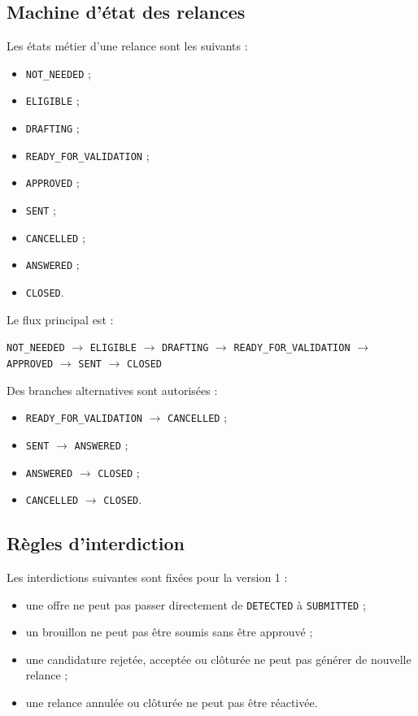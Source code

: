 \documentclass[11pt,a4paper]{article}
\begin{document}
\subsection{Machine d’état des relances}

Les états métier d’une relance sont les suivants :

\begin{itemize}
    \item \texttt{NOT\_NEEDED} ;
    \item \texttt{ELIGIBLE} ;
    \item \texttt{DRAFTING} ;
    \item \texttt{READY\_FOR\_VALIDATION} ;
    \item \texttt{APPROVED} ;
    \item \texttt{SENT} ;
    \item \texttt{CANCELLED} ;
    \item \texttt{ANSWERED} ;
    \item \texttt{CLOSED}.
\end{itemize}

Le flux principal est :

\begin{center}
\texttt{NOT\_NEEDED}
$\rightarrow$
\texttt{ELIGIBLE}
$\rightarrow$
\texttt{DRAFTING}
$\rightarrow$
\texttt{READY\_FOR\_VALIDATION}
$\rightarrow$
\texttt{APPROVED}
$\rightarrow$
\texttt{SENT}
$\rightarrow$
\texttt{CLOSED}
\end{center}

Des branches alternatives sont autorisées :

\begin{itemize}
    \item \texttt{READY\_FOR\_VALIDATION} $\rightarrow$ \texttt{CANCELLED} ;
    \item \texttt{SENT} $\rightarrow$ \texttt{ANSWERED} ;
    \item \texttt{ANSWERED} $\rightarrow$ \texttt{CLOSED} ;
    \item \texttt{CANCELLED} $\rightarrow$ \texttt{CLOSED}.
\end{itemize}

\subsection{Règles d’interdiction}

Les interdictions suivantes sont fixées pour la version 1 :

\begin{itemize}
    \item une offre ne peut pas passer directement de \texttt{DETECTED} à \texttt{SUBMITTED} ;
    \item un brouillon ne peut pas être soumis sans être approuvé ;
    \item une candidature rejetée, acceptée ou clôturée ne peut pas générer de nouvelle relance ;
    \item une relance annulée ou clôturée ne peut pas être réactivée.
\end{itemize}
\end{document}
